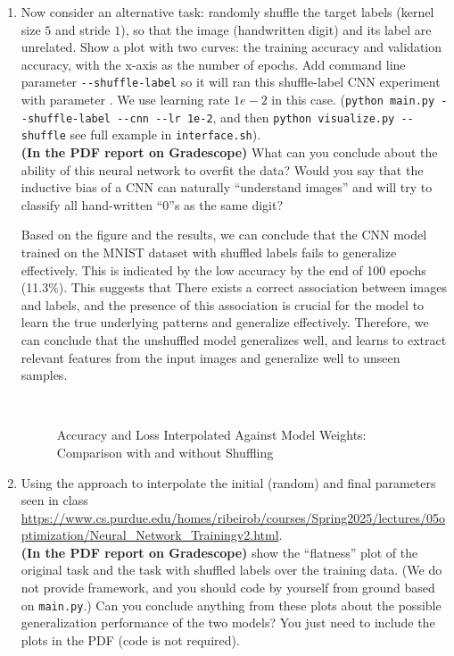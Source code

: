 \begin{enumerate}
\begin{enumerate}
\item Now consider an alternative task: randomly shuffle the target labels (kernel size $5$ and stride $1$), so that the image (handwritten digit) and its label are unrelated. Show a plot with two curves: the training accuracy and validation accuracy, with the x-axis as the number of epochs.
Add command line parameter \verb|--shuffle-label| so it will ran this shuffle-label CNN experiment with parameter . We use learning rate $1e-2$ in this case.
(\verb|python main.py --shuffle-label --cnn --lr 1e-2|, and then \verb|python visualize.py --shuffle| see full example in \texttt{interface.sh}).\\
{\bf (In the PDF report on Gradescope)} What can you conclude about the ability of this neural network to overfit the data? Would you say that the inductive bias of a CNN can naturally ``understand images'' and will try to classify all hand-written ``0''s as the same digit?

Based on the figure and the results, we can conclude that the CNN model trained
on the MNIST dataset with shuffled labels fails to generalize effectively. This
is indicated by the low accuracy by the end of 100 epochs (11.3\%). This
suggests that There exists a correct association between images and labels, and
the presence of this association is crucial for the model to learn the true
underlying patterns and generalize effectively. Therefore, we can conclude that
the unshuffled model generalizes well, and learns to extract relevant features
from the input images and generalize well to unseen samples.

\begin{figure}[ht]
    \centering
    \hfill
     \\
    \hfill
    \caption{Accuracy and Loss Interpolated Against Model Weights: 
    Comparison with and without Shuffling}
    \label{fig:interp_weights_shuffle}
\end{figure}

\item Using the approach to interpolate the initial (random) and final parameters seen in class\\
{\scriptsize\url{https://www.cs.purdue.edu/homes/ribeirob/courses/Spring2025/lectures/05optimization/Neural_Network_Trainingv2.html}}.\\
{\bf (In the PDF report on Gradescope)}
show the ``flatness'' plot of the original task and the task with shuffled labels over the training data. (We do not provide framework, and you should code by yourself from ground based on \verb|main.py|.) Can you conclude anything from these plots about the possible generalization performance of the two models?
You just need to include the plots in the PDF (code is not required).


\end{enumerate}
\end{enumerate}
